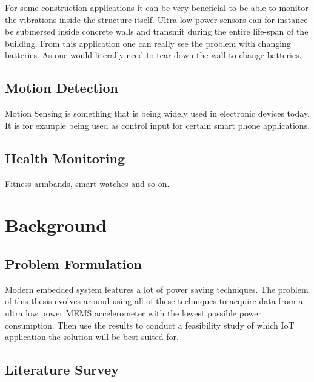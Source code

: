 For some construction applications it can be very beneficial to be able to monitor the vibrations inside the structure itself. Ultra low power sensors can for instance be submersed inside concrete walls and transmit during the entire life-span of the building. From this application one can really see the problem with changing batteries. As one would literally need to tear down the wall to change batteries. 

\subsection{Motion Detection}

Motion Sensing is something that is being widely used in electronic devices today. It is for example being used as control input for certain smart phone applications.

\subsection{Health Monitoring}

Fitness armbands, smart watches and so on.


\section{Background}
\subsection*{Problem Formulation}

Modern embedded system features a lot of power saving techniques. The problem of this thesis evolves around using all of these techniques to acquire data from a ultra low power MEMS accelerometer with the lowest possible power consumption. Then use the results to conduct a feasibility study of which IoT application the solution will be best suited for.

\subsection*{Literature Survey}

